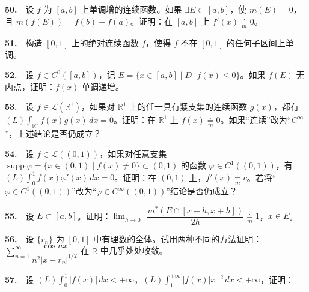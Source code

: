 \documentclass[11pt,a4paper]{article}
\begin{document}
\par{}\hypertarget{review50}{}\noindent \textbf{50.}　设 \(f\) 为 \([a,b]\) 上单调增的连续函数。如果 \(\exists E\subset[a,b]\)，使 \(m(E)=0\)，且 \(m(f(E))=f(b)-f(a)\)。证明：在 \([a,b]\) 上 \(f'(x)\underset{m}{\overset{\cdot}{=}}0\)。

\par{}\hypertarget{review51}{}\noindent \textbf{51.}　构造 \([0,1]\) 上的绝对连续函数 \(f\)，使得 \(f\) 不在 \([0,1]\) 的任何子区间上单调。

\par{}\hypertarget{review52}{}\noindent \textbf{52.}　设 \(f\in C^0([a,b])\)，记 \(E=\{x\in[a,b]\mid D^+f(x)\le0\}\)。如果 \(f(E)\) 无内点，证明：\(f(x)\) 单调递增。

\par{}\hypertarget{review53}{}\noindent \textbf{53.}　设 \(f\in\mathcal L(\mathbb R^1)\)，如果对 \(\mathbb R^1\) 上的任一具有紧支集的连续函数 \(g(x)\)，都有 \((L)\int_{\mathbb R^1}f(x)g(x)\,dx=0\)。证明：在 \(\mathbb R^1\) 上 \(f(x)\underset{m}{\overset{\cdot}{=}}0\)。如果``连续''改为``\(C^\infty\)''，上述结论是否仍成立？

\par{}\hypertarget{review54}{}\noindent \textbf{54.}　设 \(f\in\mathcal L((0,1))\)，如果对任意支集 \(\operatorname{supp}\varphi=\overline{\{x\in(0,1)\mid f(x)\ne0\}}\subset(0,1)\) 的函数 \(\varphi\in C^1((0,1))\)，有 \((L)\int_0^1f(x)\varphi'(x)\,dx=0\)。证明：在 \((0,1)\) 上，\(f'(x)\underset{m}{\overset{\cdot}{=}} c\)。若将``\(\varphi\in C^1((0,1))\)''改为``\(\varphi\in C^\infty((0,1))\)''结论是否仍成立？

\par{}\hypertarget{review55}{}\noindent \textbf{55.}　设 \(E\subset[a,b]\)。证明：\(\lim_{h\to0^+}\dfrac{m^*(E\cap[x-h,x+h])}{2h}\underset{m}{\overset{\cdot}{=}}1\)，\(x\in E\)。

\par{}\hypertarget{review56}{}\noindent \textbf{56.}　设 \(\{r_n\}\) 为 \([0,1]\) 中有理数的全体。试用两种不同的方法证明：\(\sum_{n=1}^\infty\dfrac{\cos nx}{n^2|x-r_n|^{1/2}}\) 在 \(\mathbb R\) 中几乎处处收敛。

\par{}\hypertarget{review57}{}\noindent \textbf{57.}　设 \((L)\int_0^1|f(x)|\,dx<+\infty\)，\((L)\int_1^{+\infty}|f(x)|x^{-2}\,dx<+\infty\)，证明：
\end{document}
